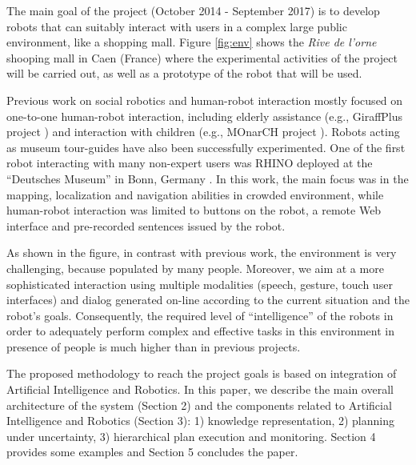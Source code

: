 The main goal of the \coaches project (October 2014 - September 2017)  is to develop robots that can suitably interact with users in a complex large public environment, like a shopping mall.
Figure \ref{fig:env} shows the \emph{Rive de l'orne} shooping mall in Caen (France) where the experimental activities of the project will be carried out, as well as a prototype of the robot that will be used.


Previous work on social robotics and human-robot interaction mostly focused on one-to-one human-robot interaction, including elderly assistance (e.g., GiraffPlus project \cite{CoCe14}) and interaction with children (e.g., MOnarCH project \cite{FeSe14}). Robots acting as museum tour-guides have also been successfully experimented. One of the first robot interacting with many non-expert users was RHINO deployed at the ``Deutsches Museum'' in Bonn,
Germany \cite{BuCr98}. In this work, the main focus was in the mapping, localization and navigation abilities in crowded environment, while human-robot interaction was limited to buttons on the robot, a remote Web interface and pre-recorded sentences issued by the robot.

As shown in the figure, in contrast with previous work, the \coaches environment is very challenging, because populated by many people.
Moreover, we aim at a more sophisticated interaction using multiple modalities (speech, gesture, touch user interfaces) and dialog generated on-line according to the current situation
and the robot's goals.
Consequently, the required level of ``intelligence'' of the \coaches robots in order to adequately perform complex and effective tasks in this environment in presence of people is much higher than in previous projects.

The proposed methodology to reach the project goals is based on integration of Artificial Intelligence and Robotics.
In this paper, we describe the main overall architecture of the system (Section 2) and the components related to Artificial Intelligence and Robotics (Section 3): 1) knowledge representation, 2) planning under uncertainty, 3) hierarchical plan execution and monitoring. 
Section 4 provides some examples and Section 5 concludes the paper.



